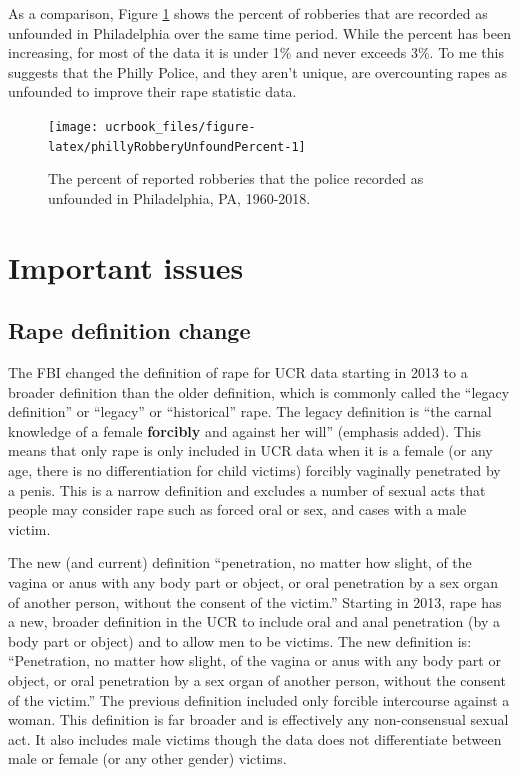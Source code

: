 \documentclass[
  12pt,
  openany]{book}
\begin{document}
As a comparison, Figure \ref{fig:phillyRobberyUnfoundPercent} shows the percent of robberies that are recorded as unfounded in Philadelphia over the same time period. While the percent has been increasing, for most of the data it is under 1\% and never exceeds 3\%. To me this suggests that the Philly Police, and they aren't unique, are overcounting rapes as unfounded to improve their rape statistic data.

\begin{figure}

{\centering \texttt{[image: ucrbook\_files/figure-latex/phillyRobberyUnfoundPercent-1]} 

}

\caption{The percent of reported robberies that the police recorded as unfounded in Philadelphia, PA, 1960-2018.}\label{fig:phillyRobberyUnfoundPercent}
\end{figure}

\hypertarget{important-issues}{%
\section{Important issues}\label{important-issues}}

\hypertarget{rape-definition-change}{%
\subsection{Rape definition change}\label{rape-definition-change}}

The FBI changed the definition of rape for UCR data starting in 2013 to a broader definition than the older definition, which is commonly called the ``legacy definition'' or ``legacy'' or ``historical'' rape. The legacy definition is ``the carnal knowledge of a female \textbf{forcibly} and against her will'' (emphasis added). This means that only rape is only included in UCR data when it is a female (or any age, there is no differentiation for child victims) forcibly vaginally penetrated by a penis. This is a narrow definition and excludes a number of sexual acts that people may consider rape such as forced oral or sex, and cases with a male victim.

The new (and current) definition ``penetration, no matter how slight, of the vagina or anus with any body part or object, or oral penetration by a sex organ of another person, without the consent of the victim.'' Starting in 2013, rape has a new, broader definition in the UCR to include oral and anal penetration (by a body part or object) and to allow men to be victims. The new definition is: ``Penetration, no matter how slight, of the vagina or anus with any body part or object, or oral penetration by a sex organ of another person, without the consent of the victim.'' The previous definition included only forcible intercourse against a woman. This definition is far broader and is effectively any non-consensual sexual act. It also includes male victims though the data does not differentiate between male or female (or any other gender) victims.
\end{document}
